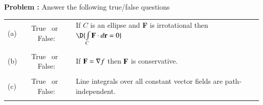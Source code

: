 {\bf Problem :} Answer the following true/false questions

	\setlength{\extrarowheight}{-0.2cm}
	\begin{tabular}{p{0.2cm}cp{16.2cm}}
		(a) & True \, or \, False: & If $C$ is an ellipse and {\bf F} is irrotational then $\D{\int \limits_{C} {\bf F} \cdot d{\bf r}=0}$\\
		\\
		(b) & True \, or \, False: & If ${\bf F} = \nabla f$ then ${\bf F}$ is conservative.\\
		\\
		(c) & True \, or \, False: & Line integrals over all constant vector fields are path-independent.\\
		\\
		\hline

\end{tabular}
